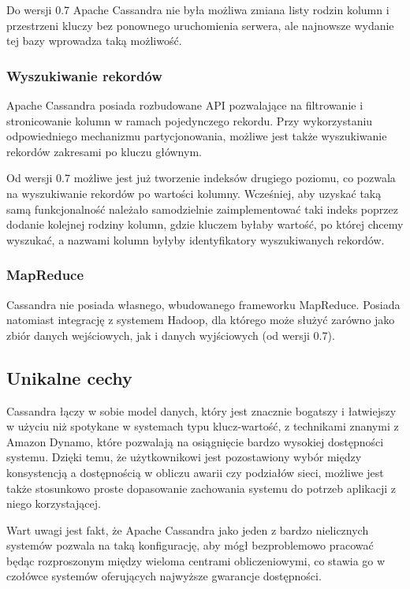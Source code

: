 Do wersji 0.7 Apache Cassandra nie była możliwa zmiana listy rodzin kolumn i przestrzeni kluczy bez ponownego uruchomienia serwera, ale najnowsze wydanie tej bazy wprowadza taką możliwość.

\subsubsection*{Wyszukiwanie rekordów}

Apache Cassandra posiada rozbudowane API pozwalające na filtrowanie i stronicowanie kolumn w ramach pojedynczego rekordu.
Przy wykorzystaniu odpowiedniego mechanizmu partycjonowania, możliwe jest także wyszukiwanie rekordów zakresami po kluczu głównym.

Od wersji 0.7 możliwe jest już tworzenie indeksów drugiego poziomu, co pozwala na wyszukiwanie rekordów po wartości kolumny.
Wcześniej, aby uzyskać taką samą funkcjonalność należało samodzielnie zaimplementować taki indeks poprzez dodanie kolejnej rodziny kolumn, gdzie kluczem byłaby wartość, po której chcemy wyszukać, a nazwami kolumn byłyby identyfikatory wyszukiwanych rekordów.

\subsubsection*{MapReduce}

Cassandra nie posiada własnego, wbudowanego frameworku MapReduce.
Posiada natomiast integrację z systemem Hadoop, dla którego może służyć zarówno jako zbiór danych wejściowych, jak i danych wyjściowych (od wersji 0.7).

\subsection*{Unikalne cechy}

Cassandra łączy w sobie model danych, który jest znacznie bogatszy i łatwiejszy w użyciu niż spotykane w systemach typu klucz-wartość, z technikami znanymi z Amazon Dynamo, które pozwalają na osiągnięcie bardzo wysokiej dostępności systemu.
Dzięki temu, że użytkownikowi jest pozostawiony wybór między konsystencją a dostępnością w obliczu awarii czy podziałów sieci, możliwe jest także stosunkowo proste dopasowanie zachowania systemu do potrzeb aplikacji z niego korzystającej.

Wart uwagi jest fakt, że Apache Cassandra jako jeden z bardzo nielicznych systemów pozwala na taką konfigurację, aby mógł bezproblemowo pracować będąc rozproszonym między wieloma centrami obliczeniowymi, co stawia go w czołówce systemów oferujących najwyższe gwarancje dostępności.

